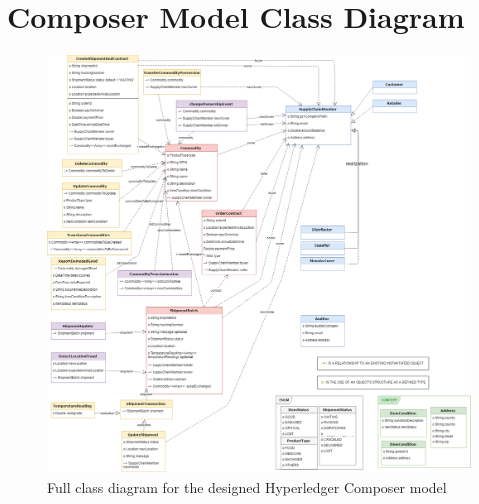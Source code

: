 \chapter{Composer Model Class Diagram}
\label{chap:appendix-b}

\begin{figure}[h]
    \centering
    \includegraphics[scale=0.32]{media/full_class_diagram.png}
    \caption[Full class diagram for the designed Hyperledger Composer model]{Full class diagram for the designed Hyperledger Composer model}
    \label{fig:full_class_diagram}
\end{figure}